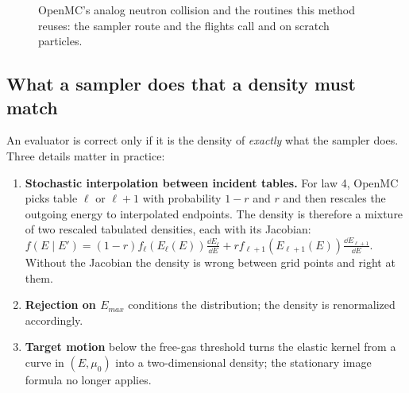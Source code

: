 \begin{figure}[t]\centering
{}
\caption{OpenMC's analog neutron collision and the routines this method reuses: the sampler route and
the flights call  and  on scratch particles.}\label{fig:nd:collision}
\end{figure}

\subsection{What a sampler does that a density must match}

An evaluator is correct only if it is the density of \emph{exactly} what the sampler does. Three
details matter in practice:
\begin{enumerate}
\item \textbf{Stochastic interpolation between incident tables.} For law 4, OpenMC picks table
  $\ell$ or $\ell+1$ with probability $1-r$ and $r$ and then rescales the outgoing energy to
  interpolated endpoints. The density is therefore a mixture of two rescaled tabulated densities,
  each with its Jacobian:
  $f(E\mid E')=(1-r)f_\ell(E_\ell(E))\frac{\dd E_\ell}{\dd E}+rf_{\ell+1}(E_{\ell+1}(E))\frac{\dd E_{\ell+1}}{\dd E}$.
  Without the Jacobian the density is wrong between grid points and right at them.
\item \textbf{Rejection on $E_{max}$} conditions the distribution; the density is renormalized
  accordingly.
\item \textbf{Target motion} below the free-gas threshold turns the elastic kernel from a curve in
  $(E,\mu_0)$ into a two-dimensional density; the stationary image formula no longer applies.
\end{enumerate}


